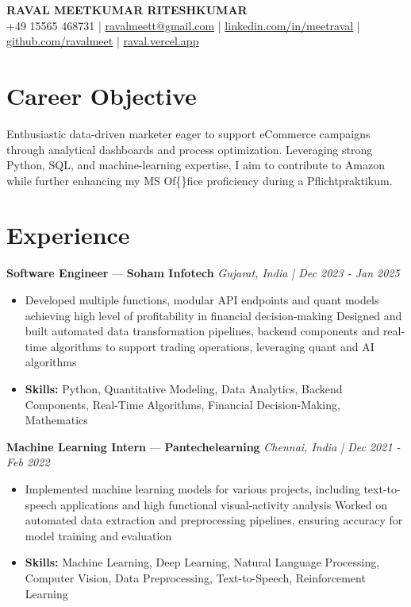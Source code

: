 \documentclass[a4paper,10pt]{article}
\begin{document}
\begin{center}
  {\Large\bfseries RAVAL MEETKUMAR RITESHKUMAR}\\[2pt]
  {\small +49 15565 468731 \;|\; \href{mailto:ravalmeett@gmail.com}{ravalmeett@gmail.com} \;|\; \href{https://www.linkedin.com/in/meetraval/}{linkedin.com/in/meetraval} \;|\; \href{https://github.com/ravalmeet}{github.com/ravalmeet} \;|\; \href{https://raval.vercel.app/}{raval.vercel.app}}
\end{center}
\vspace{-3pt}

\section*{Career Objective}
Enthusiastic data-driven marketer eager to support eCommerce campaigns through analytical dashboards and process optimization. Leveraging strong Python, SQL, and machine-learning expertise, I aim to contribute to Amazon while further enhancing my MS Of\{\}fice proficiency during a Pflichtpraktikum.\par

\section*{Experience}
\textbf{Software Engineer} — \textbf{Soham Infotech} \hfill \textit{Gujarat, India \;|\; Dec 2023 - Jan 2025}\par
\vspace{1pt}
\begin{itemize}
  \item Developed multiple functions, modular API endpoints and quant models achieving high level of profitability in financial decision-making Designed and built automated data transformation pipelines, backend components and real-time algorithms to support trading operations, leveraging quant and AI algorithms
  \item \textbf{Skills:} Python, Quantitative Modeling, Data Analytics, Backend Components, Real-Time Algorithms, Financial Decision-Making, Mathematics
\end{itemize}
\vspace{3pt}
\textbf{Machine Learning Intern} — \textbf{Pantechelearning} \hfill \textit{Chennai, India \;|\; Dec 2021 - Feb 2022}\par
\vspace{1pt}
\begin{itemize}
  \item Implemented machine learning models for various projects, including text-to-speech applications and high functional visual-activity analysis Worked on automated data extraction and preprocessing pipelines, ensuring accuracy for model training and evaluation
  \item \textbf{Skills:} Machine Learning, Deep Learning, Natural Language Processing, Computer Vision, Data Preprocessing, Text-to-Speech, Reinforcement Learning
\end{itemize}
\end{document}
